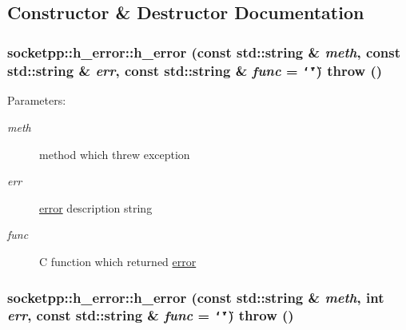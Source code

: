 \subsection{Constructor \& Destructor Documentation}
\hypertarget{classsocketpp_1_1h__error_c15a1c6216114250241349fdfcdeb98a}{
\subsubsection[{h\_\-error}]{\setlength{\rightskip}{0pt plus 5cm}socketpp::h\_\-error::h\_\-error (const std::string \& {\em meth}, \/  const std::string \& {\em err}, \/  const std::string \& {\em func} = {\tt \char`\"{}\char`\"{}})  throw ()}}
\label{classsocketpp_1_1h__error_c15a1c6216114250241349fdfcdeb98a}


\begin{Desc}
\item[Parameters:]
\begin{description}
\item[{\em meth}]method which threw exception \item[{\em err}]\hyperlink{classsocketpp_1_1error}{error} description string \item[{\em func}]C function which returned \hyperlink{classsocketpp_1_1error}{error} \end{description}
\end{Desc}
\hypertarget{classsocketpp_1_1h__error_67e7b6bcd23ebdd79a5fdcf1f01070fe}{
\subsubsection[{h\_\-error}]{\setlength{\rightskip}{0pt plus 5cm}socketpp::h\_\-error::h\_\-error (const std::string \& {\em meth}, \/  int {\em err}, \/  const std::string \& {\em func} = {\tt \char`\"{}\char`\"{}})  throw ()}}
\label{classsocketpp_1_1h__error_67e7b6bcd23ebdd79a5fdcf1f01070fe}


